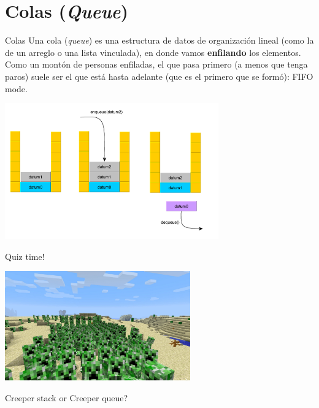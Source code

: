 \documentclass[spanish, c]{beamer}
\begin{document}
\section{Colas (\textit{Queue})}

\begin{frame}{Colas}    
    Una \alert{cola} (\textit{queue}) es una estructura de datos de organización lineal (como la de un arreglo o una lista vinculada), en donde vamos \textbf{enfilando} los elementos. Como un montón de personas enfiladas, el que pasa primero (a menos que tenga paros) suele ser el que está hasta adelante (que es el primero que se formó): FIFO mode.
    \begin{center}
        \includegraphics[width=0.69\textwidth]{queue.pdf}
    \end{center}
\end{frame}

\begin{frame}[plain]
    \begin{center}
        \Huge
        Quiz time!
    \end{center}
\end{frame}

\begin{frame}[plain]
    
    \begin{center}
        \includegraphics[width=0.6\textwidth]{creeper-queue.png}

        \bigskip

        {\huge Creeper stack or Creeper queue?}
    \end{center}

\end{frame}
\end{document}
